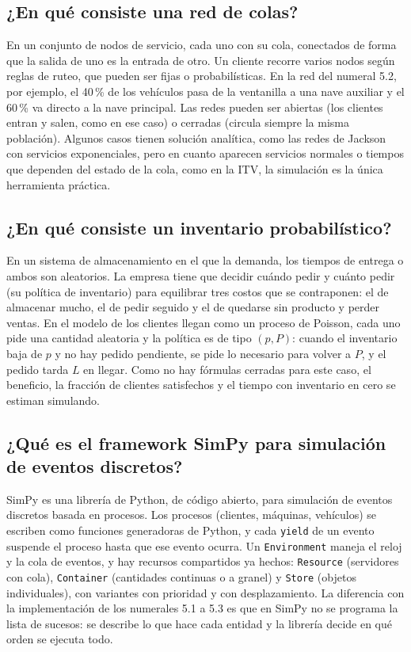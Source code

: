 \documentclass[11pt,letterpaper]{article}
\begin{document}
\subsection{¿En qué consiste una red de colas?}

En un conjunto de nodos de servicio, cada uno con su cola, conectados de forma que la salida de uno es la
entrada de otro. Un cliente recorre varios nodos según reglas de ruteo, que pueden ser fijas o
probabilísticas. En la red del numeral 5.2, por ejemplo, el 40\,\% de los vehículos pasa de la ventanilla a una
nave auxiliar y el 60\,\% va directo a la nave principal. Las redes pueden ser abiertas (los clientes entran y
salen, como en ese caso) o cerradas (circula siempre la misma población). Algunos casos tienen solución
analítica, como las redes de Jackson con servicios exponenciales, pero en cuanto aparecen servicios normales o
tiempos que dependen del estado de la cola, como en la ITV, la simulación es la única herramienta práctica.

\subsection{¿En qué consiste un inventario probabilístico?}

En un sistema de almacenamiento en el que la demanda, los tiempos de entrega o ambos son aleatorios. La
empresa tiene que decidir cuándo pedir y cuánto pedir (su política de inventario) para equilibrar tres costos
que se contraponen: el de almacenar mucho, el de pedir seguido y el de quedarse sin producto y perder ventas.
En el modelo de \cite{rios08} los clientes llegan como un proceso de Poisson, cada uno pide una cantidad
aleatoria y la política es de tipo $(p, P)$: cuando el inventario baja de $p$ y no hay pedido pendiente, se pide
lo necesario para volver a $P$, y el pedido tarda $L$ en llegar. Como no hay fórmulas cerradas para este caso,
el beneficio, la fracción de clientes satisfechos y el tiempo con inventario en cero se estiman simulando.

\subsection{¿Qué es el framework SimPy para simulación de eventos discretos?}

SimPy es una librería de Python, de código abierto, para simulación de eventos discretos basada en
procesos. Los procesos (clientes, máquinas, vehículos) se escriben como funciones generadoras de Python, y
cada \texttt{yield} de un evento suspende el proceso hasta que ese evento ocurra. Un \texttt{Environment}
maneja el reloj y la cola de eventos, y hay recursos compartidos ya hechos: \texttt{Resource} (servidores con
cola), \texttt{Container} (cantidades continuas o a granel) y \texttt{Store} (objetos individuales), con
variantes con prioridad y con desplazamiento. La diferencia con la implementación de los numerales 5.1 a 5.3 es
que en SimPy no se programa la lista de sucesos: se describe lo que hace cada entidad y la librería decide
en qué orden se ejecuta todo.
\end{document}
